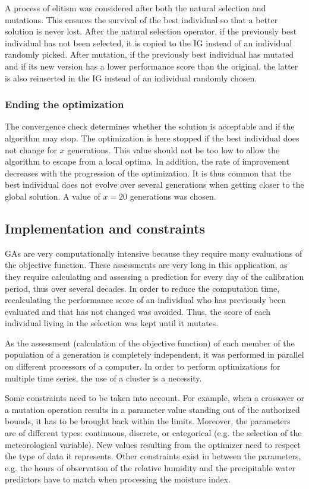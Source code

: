 \documentclass{ametsoc}
\begin{document}
A process of elitism was considered after both the natural selection and mutations. This ensures the survival of the best individual so that a better solution is never lost. After the natural selection operator, if the previously best individual has not been selected, it is copied to the IG instead of an individual randomly picked. After mutation, if the previously best individual has mutated and if its new version has a lower performance score than the original, the latter is also reinserted in the IG instead of an individual randomly chosen.


\subsubsection{Ending the optimization}

The convergence check determines whether the solution is acceptable and if the algorithm may stop. The optimization is here stopped if the best individual does not change for $x$ generations. This value should not be too low to allow the algorithm to escape from a local optima. In addition, the rate of improvement decreases with the progression of the optimization. It is thus common that the best individual does not evolve over several generations when getting closer to the global solution. A value of $x=20$ generations was chosen.


\subsection{Implementation and constraints}

GAs are very computationally intensive because they require many evaluations of the objective function. These assessments are very long in this application, as they require calculating and assessing a prediction for every day of the calibration period, thus over several decades. In order to reduce the computation time, recalculating the performance score of an individual who has previously been evaluated and that has not changed was avoided. Thus, the score of each individual living in the selection was kept until it mutates.

As the assessment (calculation of the objective function) of each member of the population of a generation is completely independent, it was performed in parallel on different processors of a computer. In order to perform optimizations for multiple time series, the use of a cluster is a necessity.

Some constraints need to be taken into account. For example, when a crossover or a mutation operation results in a parameter value standing out of the authorized bounds, it has to be brought back within the limits. Moreover, the parameters are of different types: continuous, discrete, or categorical (e.g. the selection of the meteorological variable). New values resulting from the optimizer need to respect the type of data it represents. Other constraints exist in between the parameters, e.g. the hours of observation of the relative humidity and the precipitable water predictors have to match when processing the moisture index.
\end{document}
